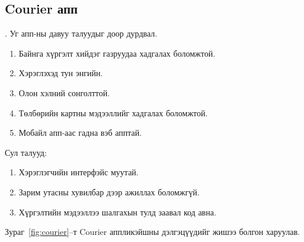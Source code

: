 \subsection{Courier апп}
. Уг апп-ны давуу талуудыг доор дурдвал.
\begin{enumerate}[noitemsep]
	\item Байнга хүргэлт хийдэг газруудаа хадгалах боломжтой.
	\item Хэрэглэхэд тун энгийн.
	\item Олон хэлний сонголттой.
	\item Төлбөрийн картны мэдээллийг хадгалах боломжтой.
    \item Мобайл апп-аас гадна вэб апптай.
\end{enumerate}

\noindent Сул талууд:
\begin{enumerate}[noitemsep]
	\item Хэрэглэгчийн интерфэйс муутай.
	\item Зарим утасны хувилбар дээр ажиллах боломжгүй.
	\item Хүргэлтийн мэдээллээ шалгахын тулд заавал код авна.
\end{enumerate}

Зураг~\ref{fig:courier}--т Courier аппликэйшны дэлгэцүүдийг жишээ болгон харуулав.

